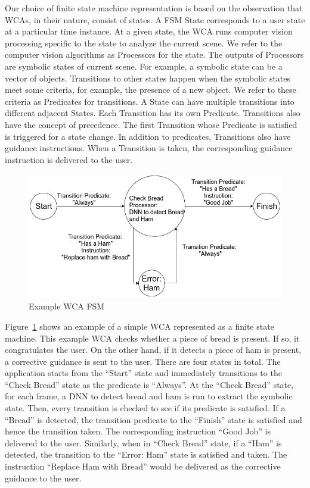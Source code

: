 Our choice of finite state machine representation is based on the observation
that WCAs, in their nature, consist of states. A FSM State corresponds to a
user state at a particular time instance. At a given state, the WCA runs
computer vision processing specific to the state to analyze the current scene.
We refer to the computer vision algorithms as Processors for the state. The
outputs of Processors are symbolic states of current scene. For example, a
symbolic state can be a vector of objects. Transitions to other states
happen when the symbolic states meet some criteria, for example, the presence of
a new object. We refer to these criteria as Predicates for transitions. A
State can have multiple transitions into different adjacent States. Each
Transition has its own Predicate. Transitions also have the concept
of precedence. The first Transition whose Predicate is satisfied is
triggered for a state change. In addition to predicates, Transitions also
have guidance instructions. When a Transition is taken, the corresponding
guidance instruction is delivered to the user.


\begin{figure}
  \centering
  \includegraphics[trim={0 0 0 0},width=\linewidth]{FIGS/fsm-example}
	\caption{Example WCA FSM}
    \label{figs:fsm-example}
\end{figure}

Figure~\ref{figs:fsm-example} shows an example of a simple WCA represented as a
finite state machine. This example WCA checks whether a piece of bread is
present. If so, it congratulates the user. On the other hand, if it detects a
piece of ham is present, a corrective guidance is sent to the user. There are
four states in total. The application starts from the ``Start'' state and
immediately transitions to the ``Check Bread'' state as the predicate is
``Always''. At the ``Check Bread'' state, for each frame, a DNN to detect bread
and ham is run to extract the symbolic state. Then, every transition is checked
to see if its predicate is satisfied. If a ``Bread'' is detected, the transition
predicate to the ``Finish'' state is satisfied and hence the transition taken.
The corresponding instruction ``Good Job'' is delivered to the user. Similarly,
when in ``Check Bread'' state, if a ``Ham'' is detected, the transition to the
``Error: Ham'' state is satisfied and taken. The instruction ``Replace Ham with
Bread'' would be delivered as the corrective guidance to the user.

